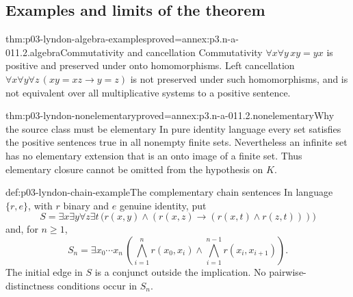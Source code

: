 \subsection{Examples and limits of the theorem}

\begin{hbtheorem}{thm:p03-lyndon-algebra-examples}{proved=annex:p3.n-a-011.2.algebra}{Commutativity and cancellation}
Commutativity \(\forall x\forall y\,xy=yx\) is positive and preserved
under onto homomorphisms. Left cancellation
\(\forall x\forall y\forall z\,(xy=xz\to y=z)\) is not preserved
under such homomorphisms, and is not equivalent over all multiplicative
systems to a positive sentence.
\end{hbtheorem}

\begin{hbtheorem}{thm:p03-lyndon-nonelementary}{proved=annex:p3.n-a-011.2.nonelementary}{Why the source class must be elementary}
In pure identity language every set satisfies the positive sentences true
in all nonempty finite sets. Nevertheless an infinite set has no elementary
extension that is an onto image of a finite set. Thus elementary closure
cannot be omitted from the hypothesis on \(K\).
\end{hbtheorem}

\begin{hbdefinition}{def:p03-lyndon-chain-example}{The complementary chain sentences}
In language \(\{r,e\}\), with \(r\) binary and \(e\) genuine identity,
put
\[
 S=\exists x\exists y\forall z\exists t\,
   \bigl(r(x,y)\land
       (r(x,z)\to(r(x,t)\land r(z,t)))\bigr)
\]
and, for \(n\geq1\),
\[
 S_n=\exists x_0\cdots x_n\,
 \left(\bigwedge_{i=1}^{n}r(x_0,x_i)
       \land\bigwedge_{i=1}^{n-1}r(x_i,x_{i+1})\right).
\]
The initial edge in \(S\) is a conjunct outside the implication. No
pairwise-distinctness conditions occur in \(S_n\).
\end{hbdefinition}

